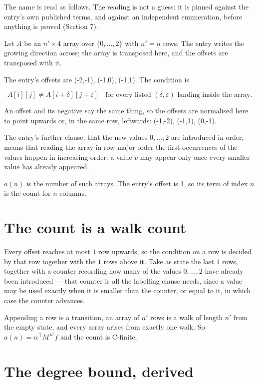 \documentclass[11pt]{article}
\theoremstyle{definition}
\begin{document}
The name is read as follows. The reading is not a guess: it is pinned against the entry's own published terms, and against an independent enumeration, before anything is proved (Section 7).

Let $A$ be an $n' \times 4$ array over $\{0,\dots,2\}$ with $n' = n$ rows. The entry writes the growing direction across; the array is transposed here, and the offsets are transposed with it.

The entry's offsets are (-2,-1), (-1,0), (-1,1). The condition is

\[A[i][j] \ne A[i{+}\delta][j{+}\varepsilon]\quad\text{for every listed }(\delta,\varepsilon)\text{ landing inside the array.}\]

An offset and its negative say the same thing, so the offsets are normalised here to point upwards or, in the same row, leftwards: (-1,-2), (-1,1), (0,-1).

The entry's further clause, that the new values $0,\dots,2$ are introduced in order, means that reading the array in row-major order the first occurrences of the values happen in increasing order: a value $v$ may appear only once every smaller value has already appeared.

$a(n)$ is the number of such arrays. The entry's offset is 1, so its term of index $n$ is the count for $n$ columns.

\section{The count is a walk count}

Every offset reaches at most $1$ row upwards, so the condition on a row is decided by that row together with the $1$ rows above it. Take as state the last $1$ rows, together with a counter recording how many of the values $0,\dots,2$ have already been introduced --- that counter is all the labelling clause needs, since a value may be used exactly when it is smaller than the counter, or equal to it, in which case the counter advances.

Appending a row is a transition, an array of $n'$ rows is a walk of length $n'$ from the empty state, and every array arises from exactly one walk. So $a(n) = w^{\mathsf T}M^{\,n'}f$ and the count is C-finite.

\section{The degree bound, derived}
\end{document}
